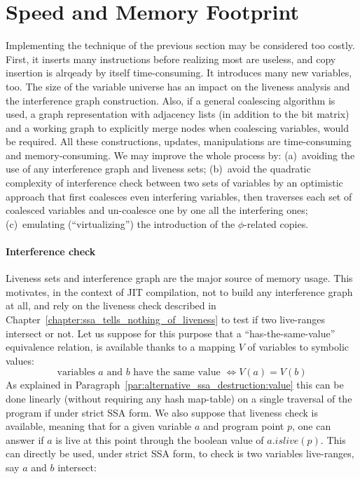 \section{Speed and Memory Footprint}
Implementing the technique of the previous section may be considered too costly. 
First, it inserts many instructions before realizing most are useless, and copy insertion is alrqeady by itself time-consuming. 
It introduces many new variables, too. 
The size of the variable universe has an impact on the liveness analysis and the interference graph construction. 
Also, if a general coalescing algorithm is used, a graph representation with adjacency lists (in addition to the bit matrix) and a working graph to explicitly merge nodes when coalescing variables, would be required. 
All these constructions, updates, manipulations are time-consuming and memory-consuming. 
We may improve the whole process by: 
(a)~avoiding the use of any interference graph and liveness sets; 
(b)~avoid the quadratic complexity of interference check between two sets of variables by an optimistic approach that first coalesces even interfering variables, then traverses each set of coalesced variables and un-coalesce one by one all the interfering ones; 
(c)~emulating (``virtualizing'') the introduction of the $\phi$-related copies.

\paragraph{Interference check}
Liveness sets and interference graph are the major source of memory usage. 
This motivates, in the context of JIT compilation, not to build any interference graph at all, and rely on the liveness check described in Chapter~\ref{chapter:ssa_tells_nothing_of_liveness} to test if two live-ranges intersect or not. 
Let us suppose for this purpose that a ``has-the-same-value'' equivalence relation, is available thanks to a mapping $V$ of variables to symbolic values: 
\\
$$\textrm{variables }a\textrm{ and }b\textrm{ have the same value } \Leftrightarrow V(a)=V(b)$$
As explained in Paragraph~\ref{par:alternative_ssa_destruction:value} this can be done linearly (without requiring any hash map-table) on a single traversal of the program if under strict SSA form. 
We also suppose that liveness check is available, meaning that for a given variable $a$ and program point $p$, one can answer if $a$ is live at this point through the boolean value of  $a.\textit{islive}(p)$. This can directly be used, under strict SSA form, to check is two variables live-ranges, say $a$ and $b$ intersect:

